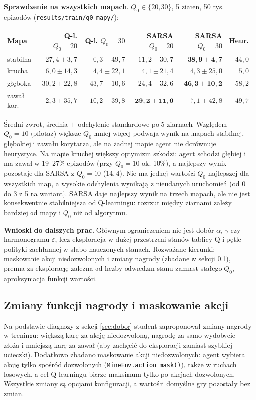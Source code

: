 \documentclass[11pt,a4paper]{article}
\begin{document}
\textbf{Sprawdzenie na wszystkich mapach.} $Q_0\in\{20, 30\}$, 5 ziaren, 50 tys.
epizodów (\texttt{results/train/q0\_mapy/}):
\begin{center}
\small
\begin{tabular}{@{}lrrrrr@{}}
\toprule
Mapa & Q-l. $Q_0{=}20$ & Q-l. $Q_0{=}30$ & SARSA $Q_0{=}20$ & SARSA $Q_0{=}30$ & Heur. \\
\midrule
stabilna & $27{,}4 \pm 3{,}7$ & $0{,}3 \pm 49{,}7$ & $11{,}2 \pm 30{,}7$ & $\mathbf{38{,}9 \pm 4{,}7}$ & $44{,}0$ \\
krucha & $6{,}0 \pm 14{,}3$ & $4{,}4 \pm 22{,}1$ & $4{,}1 \pm 21{,}4$ & $4{,}3 \pm 25{,}0$ & $5{,}0$ \\
głęboka & $30{,}2 \pm 22{,}8$ & $43{,}7 \pm 10{,}6$ & $24{,}4 \pm 32{,}6$ & $\mathbf{46{,}3 \pm 10{,}2}$ & $58{,}2$ \\
zawał kor. & $-2{,}3 \pm 35{,}7$ & $-10{,}2 \pm 39{,}8$ & $\mathbf{29{,}2 \pm 11{,}6}$ & $7{,}1 \pm 42{,}8$ & $49{,}7$ \\
\bottomrule
\end{tabular}
\end{center}
Średni zwrot, średnia $\pm$ odchylenie standardowe po 5 ziarnach. Względem $Q_0=10$
(pilotaż) większe $Q_0$ mniej więcej podwaja wynik na mapach stabilnej, głębokiej
i zawału korytarza, ale na żadnej mapie agent nie dorównuje heurystyce. Na mapie
kruchej większy optymizm szkodzi: agent schodzi głębiej i ma zawał w 19--27\%
epizodów (przy $Q_0=10$ ok. 10\%), a najlepszy wynik pozostaje dla SARSA z $Q_0=10$
($14{,}4$). Nie ma jednej wartości $Q_0$ najlepszej dla wszystkich map, a wysokie
odchylenia wynikają z nieudanych uruchomień (od 0 do 3 z 5 na wariant). SARSA daje
najlepszy wynik na trzech mapach, ale nie jest konsekwentnie stabilniejsza od
Q-learningu: rozrzut między ziarnami zależy bardziej od mapy i $Q_0$ niż od algorytmu.

\textbf{Wnioski do dalszych prac.} Głównym ograniczeniem nie jest dobór
$\alpha$, $\gamma$ czy harmonogramu $\varepsilon$, lecz eksploracja w dużej
przestrzeni stanów tablicy Q i pętle polityki zachłannej w słabo nauczonych stanach.
Rozważane kierunki: maskowanie akcji niedozwolonych i zmiany nagrody (zbadane
w sekcji \ref{sec:nagrody}), premia za eksplorację zależna od liczby odwiedzin stanu
zamiast stałego $Q_0$, aproksymacja funkcji wartości.

\subsection{Zmiany funkcji nagrody i maskowanie akcji}\label{sec:nagrody}
Na podstawie diagnozy z sekcji \ref{sec:dobor} student zaproponował zmiany nagrody
w treningu: większą karę za akcję niedozwoloną, nagrodę za samo wydobycie złoża
i mniejszą karę za zawał (aby zachęcić do eksploracji zamiast szybkiej ucieczki).
Dodatkowo zbadano maskowanie akcji niedozwolonych: agent wybiera akcję tylko spośród
dozwolonych (\texttt{MineEnv.action\_mask()}), także w ruchach losowych, a cel
Q-learningu bierze maksimum tylko po akcjach dozwolonych. Wszystkie zmiany są
opcjami konfiguracji, a wartości domyślne gry pozostały bez zmian.
\end{document}
